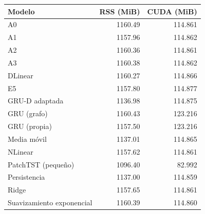 \begin{tabular}{lrr}
\toprule
Modelo & RSS (MiB) & CUDA (MiB) \\
\midrule
A0 & 1160.49 & 114.861 \\
A1 & 1157.96 & 114.862 \\
A2 & 1160.36 & 114.861 \\
A3 & 1160.38 & 114.862 \\
DLinear & 1160.27 & 114.866 \\
E5 & 1157.80 & 114.877 \\
GRU-D adaptada & 1136.98 & 114.875 \\
GRU (grafo) & 1160.43 & 123.216 \\
GRU (propia) & 1157.50 & 123.216 \\
Media móvil & 1137.01 & 114.865 \\
NLinear & 1157.62 & 114.861 \\
PatchTST (pequeño) & 1096.40 & 82.992 \\
Persistencia & 1137.00 & 114.859 \\
Ridge & 1157.65 & 114.861 \\
Suavizamiento exponencial & 1160.39 & 114.860 \\
\bottomrule
\end{tabular}
